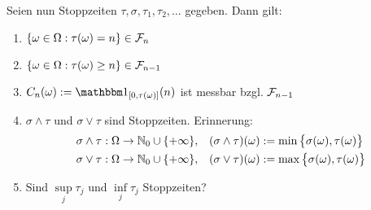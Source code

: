 Seien nun Stoppzeiten $\tau,\sigma,\tau_1,\tau_2,\ldots$ gegeben. Dann gilt:
\begin{enumerate}[label=\alph*)]
	\item $\lbrace\omega\in\Omega:\tau(\omega)=n\rbrace\in\mathcal{F}_n$
	\item $\lbrace\omega\in\Omega:\tau(\omega)\geq n\rbrace\in\mathcal{F}_{n-1}$
	\item $\begin{aligned}
		C_n(\omega):=\indi_{[0,\tau(\omega)]}(n)
	\end{aligned}$ ist messbar bzgl. $\mathcal{F}_{n-1}$
	\item $\sigma\wedge\tau$ und $\sigma\vee\tau$ sind Stoppzeiten. Erinnerung:
	\begin{align*}
		&\sigma\wedge\tau:\Omega\to\mathbb{N}_0\cup\lbrace+\infty\rbrace,&(\sigma\wedge\tau)(\omega)&:=\min\big\lbrace\sigma(\omega),\tau(\omega)\big\rbrace\\
		&\sigma\vee\tau:\Omega\to\mathbb{N}_0\cup\lbrace+\infty\rbrace,&(\sigma\vee\tau)(\omega)&:=\max\big\lbrace\sigma(\omega),\tau(\omega)\big\rbrace
	\end{align*}
	\item Sind $\sup\limits_j\tau_j$ und $\inf\limits_j\tau_j$ Stoppzeiten?
\end{enumerate}

